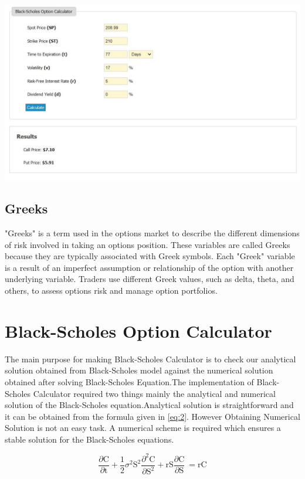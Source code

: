 \documentclass[12pt]{article}
\begin{document}
\includegraphics[width=16cm]{P2}

\subsection{Greeks}
"Greeks" is a term used in the options market to describe the different dimensions of risk involved in taking an options position. These variables are called Greeks because they are typically associated with Greek symbols. Each "Greek" variable is a result of an imperfect assumption or relationship of the option with another underlying variable. Traders use different Greek values, such as delta, theta, and others, to assess options risk and manage option portfolios. 


	
	

\section{Black-Scholes Option Calculator} \label{The Black-Scholes Model}

The main purpose for making Black-Scholes Calculator is to check our analytical solution obtained from Black-Scholes model against the numerical solution obtained after solving Black-Scholes Equation.The implementation of  Black-Scholes Calculator required two things mainly the analytical and numerical solution of the Black-Scholes equation.Analytical solution is straightforward and it can be obtained from the formula given in  \ref{eq:2}. However Obtaining Numerical Solution is not an easy task. A numerical scheme is required which ensures a stable solution for the Black-Scholes equations.

\begin{equation}
	\frac{\partial \mathrm C}{ \partial \mathrm t } + \frac{1}{2}\sigma^{2} \mathrm S^{2} \frac{\partial^{2} \mathrm C}{\partial \mathrm S^2}
	+ \mathrm r \mathrm S \frac{\partial \mathrm C}{\partial \mathrm S}\ =
	\mathrm r \mathrm C 
	\label{eq:5}
\end{equation}
\end{document}
